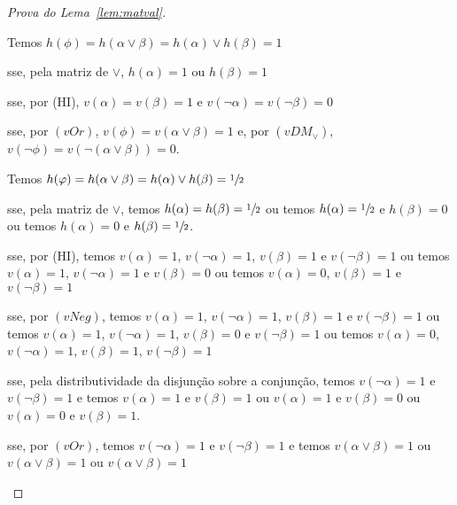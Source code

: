 \begin{proof}[Prova do Lema~\ref{lem:matval}]
\begin{provaporcasos}
            \begin{provaporsubcasos}

                    Temos $h(\phi) = h(\alpha \lor \beta) = h(\alpha) \lor h(\beta) = 1$

                    \qquad{}sse, pela matriz de $\lor$, $h(\alpha) = 1$ ou $h(\beta) = 1$

                    \qquad{}sse, por (HI), $v(\alpha) = v(\beta) = 1$ e $v(\neg \alpha) = v(\neg \beta) = 0$

                    \qquad{}sse, por $(vOr)$, $v(\phi) = v(\alpha \lor \beta) = 1$ e, por $(vDM_{\lor})$, $v(\neg \phi) = v(\neg(\alpha \lor \beta)) = 0$.


                    Temos $h(\varphi) = h(\alpha \lor \beta) = h(\alpha) \lor h(\beta) = \sfrac{1}{2}{}$

                    \qquad{}sse, pela matriz de $\lor$, temos $h(\alpha) = h(\beta) = \sfrac{1}{2}{}$ ou temos $h(\alpha) = \sfrac{1}{2}{}$ e $h(\beta) = 0$ ou temos $h(\alpha) = 0$ e $h(\beta) = \sfrac{1}{2}{}$.

                    \qquad{}sse, por (HI), temos $v(\alpha) = 1$, $v(\neg \alpha) = 1$, $v(\beta) = 1$ e $v(\neg \beta) = 1$ ou temos $v(\alpha) = 1$, $v(\neg \alpha) = 1$ e $v(\beta) = 0$ ou temos $v(\alpha) = 0$, $v(\beta) = 1$ e $v(\neg \beta) = 1$

                    \qquad{}sse, por $(vNeg)$, temos $v(\alpha) = 1$, $v(\neg \alpha) = 1$, $v(\beta) = 1$ e $v(\neg \beta) = 1$ ou temos $v(\alpha) = 1$, $v(\neg \alpha) = 1$, $v(\beta) = 0$ e $v(\neg \beta) = 1$ ou temos $v(\alpha) = 0$, $v(\neg \alpha) = 1$, $v(\beta) = 1$, $v(\neg \beta) = 1$

                    \qquad{}sse, pela distributividade da disjunção sobre a conjunção, temos $v(\neg \alpha) = 1$ e $v(\neg \beta) = 1$ e temos $v(\alpha) = 1$ e $v(\beta) = 1$ ou $v(\alpha) = 1$ e $v(\beta) = 0$ ou $v(\alpha) = 0$ e $v(\beta) = 1$.

                    \qquad{}sse, por $(vOr)$, temos $v(\neg \alpha) = 1$ e $v(\neg \beta) = 1$ e temos $v(\alpha \lor \beta) = 1$ ou $v(\alpha \lor \beta) = 1$ ou $v(\alpha \lor \beta) = 1$
                    

\end{provaporsubcasos}
\end{provaporcasos}
\end{proof}
